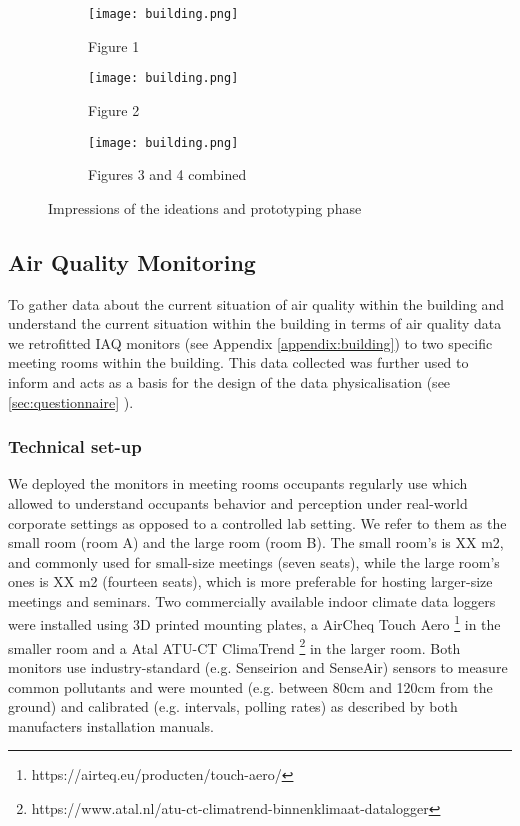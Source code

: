 \begin{figure*}[!t]
    \centering
    \begin{subfigure}[b]{0.23\textwidth}
        \texttt{[image: building.png]}
        \caption{Figure 1}
        \label{fig:1}
    \end{subfigure}
    \hfill
    \begin{subfigure}[b]{0.23\textwidth}
        \texttt{[image: building.png]}
        \caption{Figure 2}
        \label{fig:2}
    \end{subfigure}
    \hfill
    \begin{subfigure}[b]{0.5\textwidth}
        \texttt{[image: building.png]}
        \caption{Figures 3 and 4 combined}
        \label{fig:3_4_combined}
    \end{subfigure}
    \caption{Impressions of the ideations and prototyping phase}
    \label{fig:full_width}
\end{figure*}

\subsection{Air Quality Monitoring}

To gather data about the current situation of air quality within the building and understand the current situation within the building in terms of air quality data we retrofitted IAQ monitors (see Appendix \ref{appendix:building}) to two specific meeting rooms within the building.  This data collected was further used to inform and acts as a basis for the design of the data physicalisation (see \ref{sec:questionnaire} ).

\subsubsection{Technical set-up}

We deployed the monitors in meeting rooms occupants regularly use which allowed to understand occupants behavior and perception under real-world corporate settings as opposed to a controlled lab setting. We refer to them as the small room (room A) and the large room (room B). The small room’s is XX m2, and commonly used for small-size meetings (seven seats), while the large room’s ones is XX m2 (fourteen seats), which is more preferable for hosting larger-size meetings and seminars. Two commercially available indoor climate data loggers were installed using 3D printed mounting plates, a AirCheq Touch Aero \footnote{https://airteq.eu/producten/touch-aero/} in the smaller room and a Atal ATU-CT ClimaTrend \footnote{https://www.atal.nl/atu-ct-climatrend-binnenklimaat-datalogger} in the larger room. Both monitors use industry-standard (e.g. Senseirion and SenseAir) sensors to measure common pollutants and were mounted (e.g. between 80cm and 120cm from the ground) and calibrated (e.g. intervals, polling rates) as described by both manufacters installation manuals.

